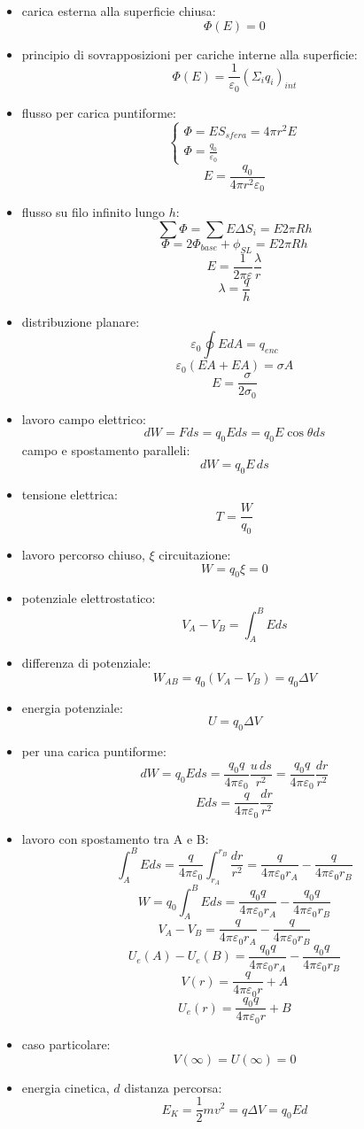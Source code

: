 \documentclass[a4paper,12pt, oneside]{book}
\begin{document}
\begin{itemize}
\item carica esterna alla superficie chiusa:
$$\Phi(E)=0$$
\item principio di sovrapposizioni per cariche interne alla superficie:
$$\Phi(E)=\frac{1}{\varepsilon_0}(\Sigma_iq_i)_{int}$$
\item flusso per carica puntiforme:
$$\begin{cases}
\Phi=ES_{sfera}=4\pi r^2 E\\
\Phi=\frac{q_0}{\varepsilon_0}
\end{cases}
$$
$$E=\frac{q_0}{4\pi r^2 \varepsilon_0}$$
\item flusso su filo infinito lungo $h$:
$$\sum \Phi=\sum E\Delta S_i=E2\pi Rh$$
$$\Phi=2\Phi_{base}+\phi_{SL}=E2\pi Rh$$
$$E=\frac{1}{2\pi\varepsilon}\frac{\lambda}{r}$$
$$\lambda=\frac{q}{h}$$
\item distribuzione planare:
$$\varepsilon_0\oint EdA=q_{enc}$$
$$\varepsilon_0(EA+EA)=\sigma A$$
$$E=\frac{\sigma}{2\sigma_0}$$
\item lavoro campo elettrico:
$$dW=Fds=q_0Eds=q_0E\cos \theta ds$$
campo e spostamento paralleli:
$$dW=q_0E\,ds$$
\item tensione elettrica:
$$T=\frac{W}{q_0}$$
\item lavoro percorso chiuso, $\xi$ circuitazione:
$$W=q_0\xi=0$$
\item potenziale elettrostatico:
$$V_A-V_B=\int_A^B Eds$$
\item differenza di potenziale:
$$W_{AB}=q_0(V_A-V_B)=q_0\Delta V$$
\item energia potenziale:
$$U=q_0\Delta V$$
\item per una carica puntiforme:
$$dW=q_0Eds=\frac{q_0q}{4\pi\varepsilon_0}\frac{u\,ds}{r^2}=\frac{q_0q}{4\pi\varepsilon_0}\frac{dr}{r^2}$$
$$Eds=\frac{q}{4\pi\varepsilon_0}\frac{dr}{r^2}$$
\item lavoro con spostamento tra A e B:
$$\int_A^B Eds=\frac{q}{4\pi\varepsilon_0}\int_{r_A}^{r_B}\frac{dr}{r^2}=\frac{q}{4\pi\varepsilon_0r_A}-\frac{q}{4\pi\varepsilon_0r_B}$$
$$W=q_0\int_A^B Eds=\frac{q_0q}{4\pi\varepsilon_0r_A}-\frac{q_0q}{4\pi\varepsilon_0r_B}$$
$$V_A-V_B=\frac{q}{4\pi\varepsilon_0r_A}-\frac{q}{4\pi\varepsilon_0r_B}$$
$$U_e(A)-U_e(B)=\frac{q_0q}{4\pi\varepsilon_0r_A}-\frac{q_0q}{4\pi\varepsilon_0r_B}$$
$$V(r)=\frac{q}{4\pi\varepsilon_0r}+A$$
$$U_e(r)=\frac{q_0q}{4\pi\varepsilon_0r}+B$$
\item caso particolare:
$$V(\infty)=U(\infty)=0$$
\item energia cinetica, $d$ distanza percorsa:
$$E_K=\frac{1}{2}mv^2=q\Delta V=q_0Ed$$

\end{itemize}
\end{document}
